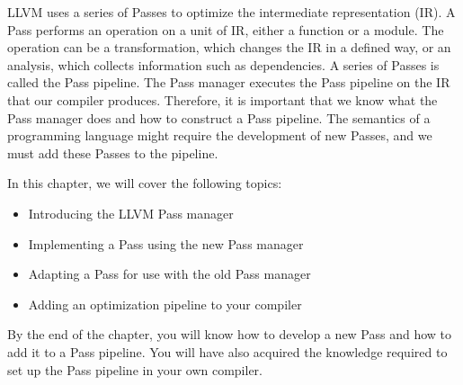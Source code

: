 LLVM uses a series of Passes to optimize the intermediate representation (IR). A Pass performs an operation on a unit of IR, either a function or a module. The operation can be a transformation, which changes the IR in a defined way, or an analysis, which collects information such as dependencies. A series of Passes is called the Pass pipeline. The Pass manager executes the Pass pipeline on the IR that our compiler produces. Therefore, it is important that we know what the Pass manager does and how to construct a Pass pipeline. The semantics of a programming language might require the development of new Passes, and we must add these Passes to the pipeline.\par

In this chapter, we will cover the following topics:\par

\begin{itemize}
	\item Introducing the LLVM Pass manager
	\item Implementing a Pass using the new Pass manager
	\item Adapting a Pass for use with the old Pass manager
	\item Adding an optimization pipeline to your compiler
\end{itemize}

By the end of the chapter, you will know how to develop a new Pass and how to add it to a Pass pipeline. You will have also acquired the knowledge required to set up the Pass pipeline in your own compiler.\par














